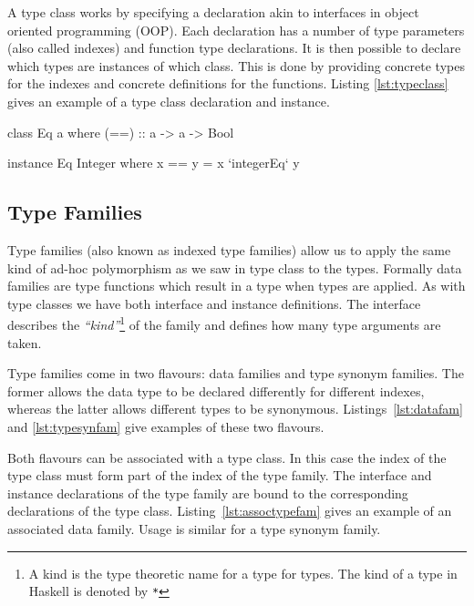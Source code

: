 \documentclass[12pt,a4paper,twoside]{scrbook}
\begin{document}
A type class works by specifying a declaration akin to interfaces in object
oriented programming (OOP). Each declaration has a number of type parameters
(also called indexes) and function type declarations. It is then possible to
declare which types are instances of which class. This is done by providing
concrete types for the indexes and concrete definitions for the
functions. Listing \ref{lst:typeclass} gives an example of a type class
declaration and instance.

\begin{hflisting}[label=lst:typeclass, caption={An example type class for
    equality. Showing the declaration and the instance for integers. Where
    \texttt{integerEq} is the implementation of integer equality on the target
    machine.}]

class Eq a where
  (==) :: a -> a -> Bool

instance Eq Integer where
  x == y =  x `integerEq` y

\end{hflisting}

\subsection{Type Families}
\label{sec:typefam}

Type families (also known as indexed type families) allow us to apply the same
kind of ad-hoc polymorphism as we saw in type class to the types. Formally data
families are type functions which result in a type when types are applied. As
with type classes we have both interface and instance definitions. The interface
describes the \emph{``kind''}\footnote{A kind is the type theoretic name for a
  type for types. The kind of a type in Haskell is denoted by \texttt{*}} of the
family and defines how many type arguments are taken.

Type families come in two flavours: data families and type synonym families. The
former allows the data type to be declared differently for different indexes,
whereas the latter allows different types to be
synonymous. Listings~\ref{lst:datafam} and \ref{lst:typesynfam} give examples of
these two flavours.

Both flavours can be associated with a type class. In this case the index of the
type class must form part of the index of the type family. The interface and
instance declarations of the type family are bound to the corresponding
declarations of the type class. Listing~\ref{lst:assoctypefam} gives an example
of an associated data family. Usage is similar for a type synonym family.
\end{document}
